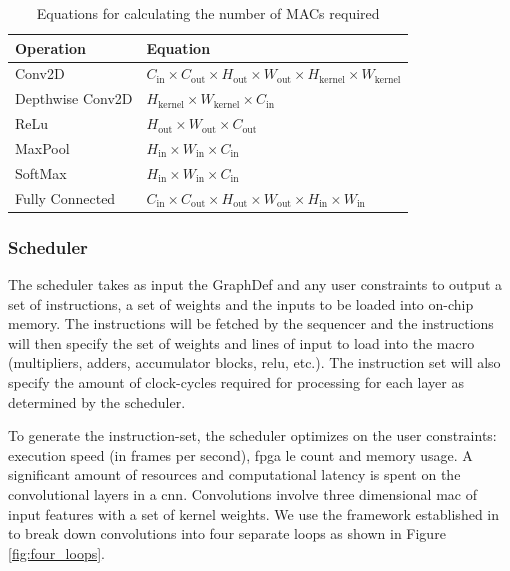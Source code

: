 \documentclass{uw-ece-wkrpt}
\begin{document}
\begin{table}
\centering
\caption{Equations for calculating the number of MACs required}\label{tab:macs_required}
\begin{tabular}{ll}
\toprule
Operation        & Equation \\
\midrule
Conv2D           & $C_\mathrm{in} \times C_\mathrm{out} \times H_\mathrm{out} \times W_\mathrm{out} \times H_\mathrm{kernel} \times W_\mathrm{kernel}$ \\
Depthwise Conv2D & $H_\mathrm{kernel} \times W_\mathrm{kernel} \times C_\mathrm{in}$ \\
ReLu             & $H_\mathrm{out} \times W_\mathrm{out} \times C_\mathrm{out}$ \\
MaxPool          & $H_\mathrm{in} \times W_\mathrm{in} \times C_\mathrm{in}$ \\
SoftMax          & $H_\mathrm{in} \times W_\mathrm{in} \times C_\mathrm{in}$ \\
Fully Connected  & $C_\mathrm{in} \times C_\mathrm{out} \times H_\mathrm{out} \times W_\mathrm{out} \times H_\mathrm{in} \times W_\mathrm{in}$ \\
\bottomrule
\end{tabular}
\end{table}

\subsubsection{Scheduler}\label{sec:scheduler}

The scheduler takes as input the GraphDef and any user constraints to output a set of instructions, a set of weights and the inputs to be loaded into on-chip memory. The instructions will be fetched by the sequencer and the instructions will then specify the set of weights and lines of input to load into the macro (multipliers, adders, accumulator blocks, \gls{relu}, etc.). The instruction set will also specify the amount of clock-cycles required for processing for each layer as determined by the scheduler.

To generate the instruction-set, the scheduler optimizes on the user constraints: execution speed (in frames per second), \gls{fpga} \gls{le} count and memory usage. A significant amount of resources and computational latency is spent on the convolutional layers in a \gls{cnn}. Convolutions involve three dimensional \gls{mac} of input features with a set of \gls{kernel} weights. We use the framework established in \cite{Ma2017Optimizing-Loop} to break down convolutions into four separate loops as shown in Figure \ref{fig:four_loops}.
\end{document}
